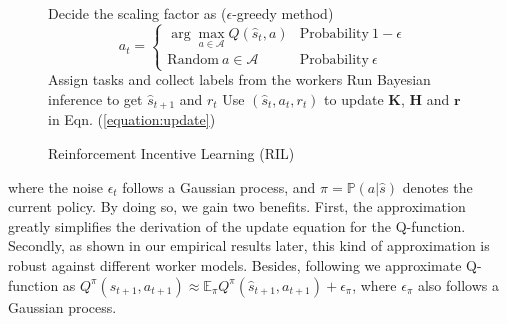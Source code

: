 \documentclass{article}
\begin{document}
\vspace{-2mm}
  \begin{wrapfigure}{R}{0.6\textwidth}
  \centering
    \begin{minipage}{0.6\textwidth}
      {\centering
      \begin{algorithm}[H]
         \caption{Reinforcement Incentive Learning (RIL)}
         \label{RAC}

      \small
      \begin{algorithmic}[1]
         \STATE Decide the scaling factor as ($\epsilon$-greedy method)
                  \vspace{-2mm}
                  $$\ \ a_t=\left\{
                  \begin{array}{ll}
                      \arg\max_{a\in\mathcal{A}}Q(\hat{s}_t,a) & \mathrm{Probability\ } 1-\epsilon\\
                      \mathrm{Random\ } a\in\mathcal{A} & \mathrm{Probability\ } \epsilon
                  \end{array}						
                   \right.$$  
                   \vspace{-3mm} 
         \STATE Assign tasks and collect labels from the workers
         \STATE Run Bayesian inference to get $\hat{s}_{t+1}$ and $r_t$
         \STATE Use $(\hat{s}_t, a_t, r_t)$ to update $\bm{K}$, $\bm{H}$ and $\bm{r}$ in Eqn. (\ref{equation:update})
         \ENDFOR
         \ENDFOR
      \end{algorithmic}
      \end{algorithm}}
    \end{minipage}
  \end{wrapfigure}
where the noise $\epsilon_t $ follows a Gaussian process, and $\pi=\mathbb{P}(a|\hat{s})$ denotes the current policy.
By doing so, we gain two benefits. First, the approximation greatly simplifies the derivation of the update equation for the Q-function. Secondly, as shown in our empirical results later, this kind of approximation is robust against different worker models.
Besides, following \cite{gasic2014gaussian} we approximate Q-function as
$Q^{\pi}(\hat{s}_{t+1},a_{t+1})\approx\mathbb{E}_{\pi}Q^{\pi}(\hat{s}_{t+1},a_{t+1})+\epsilon_{\pi}$, 
where $\epsilon_{\pi}$ also follows a Gaussian process.
\end{document}
